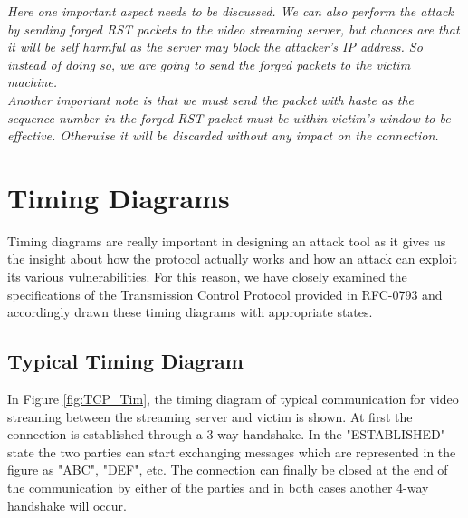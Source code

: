 \documentclass[14pt]{extarticle}
\begin{document}
     \label{sec:strategy}
    
    \textsl{Here one important aspect needs to be discussed. We can also perform the attack by sending forged RST packets to the video streaming server, but chances are that it will be self harmful as the server may block the attacker's IP address. So instead of doing so, we are going to send the forged packets to the victim machine.}  \\
    \textsl{Another important note is that we must send the packet with haste as the sequence number in the forged RST packet must be within victim's window to  be effective. Otherwise it will be discarded without any impact on the connection.}
  

\section{Timing Diagrams}
    Timing diagrams are really important in designing an attack tool as it gives us the insight about how the protocol actually works and how an attack can exploit its various vulnerabilities. For this reason, we have closely examined the specifications of the Transmission Control Protocol provided in RFC-0793 and accordingly drawn these timing diagrams with appropriate states.
    
    \subsection{Typical Timing Diagram}
        
        In Figure \ref{fig:TCP_Tim}, the timing diagram of typical communication for video streaming between the streaming server and victim is shown. At first the connection is established through a 3-way handshake. In the "ESTABLISHED" state the two parties can start exchanging messages which are represented in the figure as "ABC", "DEF", etc. The connection can finally be closed at the end of the communication by either of the parties and in both cases another 4-way handshake will occur. 
        
\end{document}

